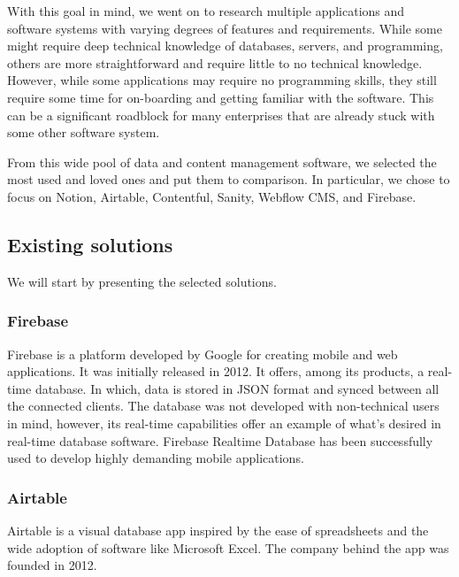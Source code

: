 With this goal in mind, we went on to research multiple applications and software systems with varying degrees of features and requirements.
While some might require deep technical knowledge of databases, servers, and programming, others are more straightforward and require little to no technical knowledge.
However, while some applications may require no programming skills, they still require some time for on-boarding and getting familiar with the software.
This can be a significant roadblock for many enterprises that are already stuck with some other software system.

From this wide pool of data and content management software, we selected the most used and loved ones and put them to comparison. In particular, we chose to focus on Notion, Airtable, Contentful, Sanity, Webflow CMS, and Firebase.

\subsection{Existing solutions}

We will start by presenting the selected solutions.

\subsubsection{Firebase}


Firebase is a platform developed by Google for creating mobile and web
applications. It was initially released in 2012. It offers, among its
products, a real-time database. In which, data is stored in JSON format
and synced between all the connected clients. The database was not
developed with non-technical users in mind, however, its real-time
capabilities offer an example of what's desired in real-time database
software. Firebase Realtime Database has been successfully used to
develop highly demanding mobile applications.

\subsubsection{Airtable}


Airtable is a visual database app inspired by the ease of spreadsheets
and the wide adoption of software like Microsoft Excel. The company
behind the app was founded in 2012.

